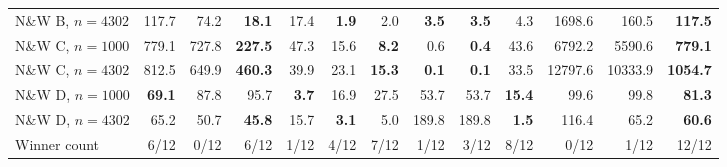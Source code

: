 \begin{table}[!t]
{{\begin{tabular}{l*{12}{r}}
N\&W B, $n=4302$ & 117.7 & 74.2 & \textbf{18.1} & 17.4 & \textbf{1.9} & 2.0 & \textbf{3.5} & \textbf{3.5} & 4.3 & 1698.6 & 160.5 & \textbf{117.5} \\
N\&W C, $n=1000$ & 779.1 & 727.8 & \textbf{227.5} & 47.3 & 15.6 & \textbf{8.2} & 0.6 & \textbf{0.4} & 43.6 & 6792.2 & 5590.6 & \textbf{779.1} \\
N\&W C, $n=4302$ & 812.5 & 649.9 & \textbf{460.3} & 39.9 & 23.1 & \textbf{15.3} & \textbf{0.1} & \textbf{0.1} & 33.5 & 12797.6 & 10333.9 & \textbf{1054.7} \\
N\&W D, $n=1000$ & \textbf{69.1} & 87.8 & 95.7 & \textbf{3.7} & 16.9 & 27.5 & 53.7 & 53.7 & \textbf{15.4} & 99.6 & 99.8 & \textbf{81.3} \\
N\&W D, $n=4302$ & 65.2 & 50.7 & \textbf{45.8} & 15.7 & \textbf{3.1} & 5.0 & 189.8 & 189.8 & \textbf{1.5} & 116.4 & 65.2 & \textbf{60.6} \\
\midrule
Winner count & 6/12 & 0/12 & 6/12 & 1/12 & 4/12 & 7/12 & 1/12 & 3/12 & 8/12 & 0/12 & 1/12 & 12/12 \\
\bottomrule
\end{tabular}%
}
}
\end{table}
